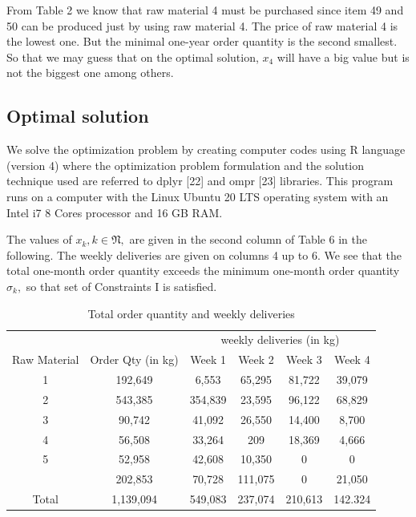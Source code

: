 \documentclass[preprint, 3p,
authoryear]{elsarticle} %
\begin{document}
From Table 2 we know that raw material 4 must be purchased since item 49
and 50 can be produced just by using raw material 4. The price of raw
material 4 is the lowest one. But the minimal one-year order quantity is
the second smallest. So that we may guess that on the optimal solution,
\(x_4\) will have a big value but is not the biggest one among others.

\hypertarget{optimal-solution}{%
\subsection{Optimal solution}\label{optimal-solution}}

We solve the optimization problem by creating computer codes using R
language (version 4) where the optimization problem formulation and the
solution technique used are referred to dplyr {[}22{]} and ompr {[}23{]}
libraries. This program runs on a computer with the Linux Ubuntu 20 LTS
operating system with an Intel i7 8 Cores processor and 16 GB RAM.

The values of \(x_k,k \in \mathfrak{N},\) are given in the second column
of Table 6 in the following. The weekly deliveries are given on columns
4 up to 6. We see that the total one-month order quantity exceeds the
minimum one-month order quantity \(\sigma_k,\) so that set of
Constraints I is satisfied.

\begin{table}[!h]

\caption{\label{tab:unnamed-chunk-9}Total order quantity and weekly deliveries}
\centering
\begin{tabular}[t]{cccccc}
\toprule
\multicolumn{2}{c}{ } & \multicolumn{4}{c}{weekly deliveries (in kg)} \\
\cmidrule(l{3pt}r{3pt}){3-6}
Raw Material & Order Qty
(in kg) & Week 1 & Week 2 & Week 3 & Week 4\\
\midrule
1 & 192,649 & 6,553 & 65,295 & 81,722 & 39,079\\
2 & 543,385 & 354,839 & 23,595 & 96,122 & 68,829\\
3 & 90,742 & 41,092 & 26,550 & 14,400 & 8,700\\
4 & 56,508 & 33,264 & 209 & 18,369 & 4,666\\
5 & 52,958 & 42,608 & 10,350 & 0 & 0\\
\addlinespace
6 & 202,853 & 70,728 & 111,075 & 0 & 21,050\\
Total & 1,139,094 & 549,083 & 237,074 & 210,613 & 142.324\\
\bottomrule
\end{tabular}
\end{table}
\end{document}
